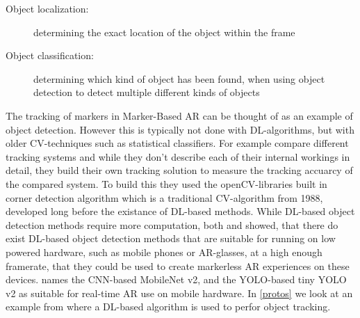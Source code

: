 \begin{description}
	\item[Object localization:] determining the exact location of the object within the frame
	\item[Object classification:] determining which kind of object has been found, when using object detection to detect multiple different kinds of objects
\end{description} \par

	The tracking of markers in Marker-Based AR can be thought of as an 
example of object detection. However this is typically not done with 
DL-algorithms, but with older CV-techniques such as statistical 
classifiers.\cite{ghasemi} For example \textcite{zhangFronzNavab} compare 
different tracking systems and while they don't describe each of their 
internal workings in detail, they build their own tracking solution to measure 
the tracking accuarcy of the compared system. To build this they used the 
openCV-libraries built in corner detection algorithm which is a traditional 
CV-algorithm from 1988, developed long before the existance of DL-based 
methods.\cite{opencvHarris} While DL-based object detection methods require 
more computation, both \textcite{ghasemi} and 
\textcite{minaee2022modernaugmentedrealityapplications} showed, that there do 
exist DL-based object detection methods that are suitable for running on low 
powered hardware, such as mobile phones or AR-glasses, at a high enough 
framerate, that they could be used to create markerless AR experiences on 
these devices. \textcite{ghasemi} names the CNN-based MobileNet v2, and the 
YOLO-based tiny YOLO v2 as suitable for real-time AR use on mobile hardware. 
In \ref{protos} we look at an example from \textcite{estrada} where a 
DL-based algorithm is used to perfor object tracking.\par


